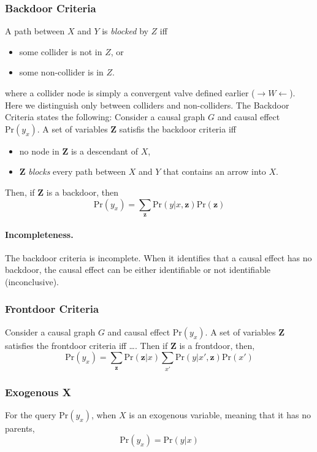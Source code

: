 \documentclass[11pt]{article}
\newcommand{\bz}{\mathbf{z}}
\newcommand{\pr}{\mathrm{Pr}}
\begin{document}
\subsubsection{Backdoor Criteria}
A path between $X$ and $Y$ is \textit{\color{Thistle} blocked} by $Z$ iff 
\begin{itemize}
	\item some collider is not in $Z$, or
	\item some non-collider is in $Z$. 
\end{itemize}
where a collider node is simply a convergent valve defined earlier ($\rightarrow W \leftarrow$). Here we distinguish only between colliders and non-colliders. The Backdoor Criteria states the following: Consider a causal graph $G$ and causal effect $\pr(y_x)$. A set of variables $\mathbf Z$ satisfis the backdoor criteria iff 
\begin{itemize}
	\item no node in $\mathbf Z$ is a descendant of $X$, 
	\item $\mathbf Z$ \textit{\color{Thistle} blocks} every path between $X$ and $Y$ that contains an arrow into $X$. 
\end{itemize}
Then, if $\mathbf Z$ is a backdoor, then
\begin{equation}
	\pr ( y _ x) = \sum_{\bz} \pr (y | x, \bz) \pr (\bz)
\end{equation}

\paragraph{Incompleteness.} The backdoor criteria is incomplete. When it identifies that a causal effect has no backdoor, the causal effect can be either identifiable or not identifiable (inconclusive).  


\subsubsection{Frontdoor Criteria}
Consider a causal graph $G$ and causal effect $\pr(y_x)$. A set of variables $\mathbf Z$ satisfies the frontdoor criteria iff \dots. Then if $\mathbf Z$ is a frontdoor, then, 
\begin{equation}
	\pr ( y _ x ) = \sum _ \bz \pr (\bz | x ) \sum_{x'} \pr(y | x', \bz ) \pr(x')
\end{equation}

\subsubsection{Exogenous X\label{sec:exox}}
For the query $\pr (y_x)$, when $X$ is an exogenous variable, meaning that it has no parents, 
\begin{equation}
	\pr(y _x) = \pr (y | x)
\end{equation}
\end{document}
